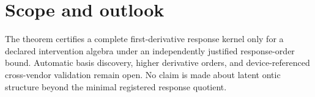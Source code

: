 \documentclass[aps,prl,onecolumn,superscriptaddress,nofootinbib]{revtex4-2}
\begin{document}
\section{Scope and outlook}
The theorem certifies a complete first-derivative response kernel only for a declared intervention algebra under an independently justified response-order bound.  Automatic basis discovery, higher derivative orders, and device-referenced cross-vendor validation remain open.  No claim is made about latent ontic structure beyond the minimal registered response quotient.


\end{document}
